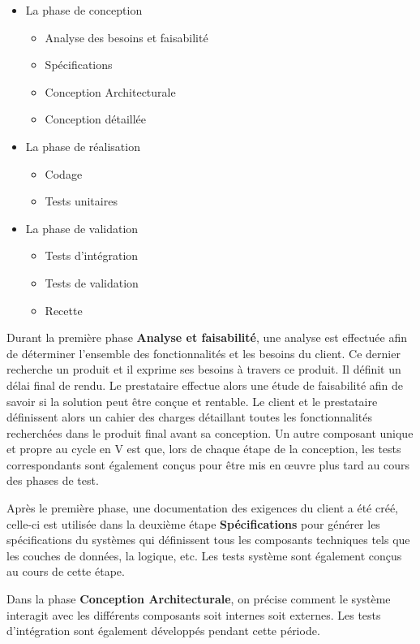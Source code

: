 \begin{itemize}
	\item La phase de conception
		\begin{itemize}
			\item Analyse des besoins et faisabilité
			\item Spécifications
			\item Conception Architecturale 
			\item Conception détaillée
		\end{itemize}
	\item La phase de réalisation
		\begin{itemize}
			\item Codage
			\item Tests unitaires
		\end{itemize}
	\item La phase de validation 
		\begin{itemize}
			\item Tests d'intégration
			\item Tests de validation
			\item Recette
		\end{itemize}
\end{itemize}

Durant la première phase \textbf{Analyse et faisabilité}, une analyse est effectuée afin de déterminer l'ensemble des fonctionnalités et les besoins du client. Ce dernier recherche un produit et il exprime ses besoins à travers ce produit. Il définit un délai final de rendu. Le prestataire effectue alors une étude de faisabilité afin de savoir si la solution peut être conçue et rentable. Le client et le prestataire définissent alors un cahier des charges détaillant toutes les fonctionnalités recherchées dans le produit final avant sa conception. Un autre composant unique et propre au cycle en V est que, lors de chaque étape de la conception, les tests correspondants sont également conçus pour être mis en œuvre plus tard au cours des phases de test.

Après le première phase, une documentation des exigences du client a été créé, celle-ci est utilisée dans la deuxième étape \textbf{Spécifications} pour générer les spécifications du systèmes qui définissent tous les composants techniques tels que les couches de données, la logique, etc. Les tests système sont également conçus au cours de cette étape.

Dans la phase \textbf{Conception Architecturale}, on précise comment le système interagit avec les différents composants soit internes soit externes. Les tests d'intégration sont également développés pendant cette période.

